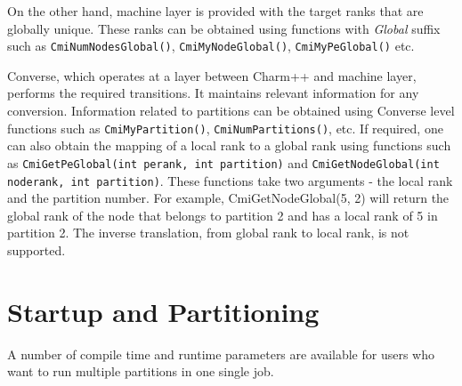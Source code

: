 On the other hand, machine layer is provided with the target ranks that
are globally unique. These ranks can be obtained using functions with \emph{Global}
suffix such as {\tt CmiNumNodesGlobal()}, {\tt CmiMyNodeGlobal()}, {\tt CmiMyPeGlobal()} etc.

Converse, which operates at a layer between Charm++ and machine layer,
performs the required transitions. It maintains relevant information for any
conversion. Information related to partitions can be obtained using Converse
level functions such as {\tt CmiMyPartition()}, {\tt CmiNumPartitions()}, 
etc. If required, one can also obtain the mapping of a local rank to a global
rank using functions such as {\tt CmiGetPeGlobal(int perank, int partition)} and 
{\tt CmiGetNodeGlobal(int noderank, int partition)}. These functions
take two arguments - the local rank and the partition number. For example, 
CmiGetNodeGlobal(5, 2) will return the global rank of the node that belongs to 
partition 2 and has a local rank of 5 in partition 2. The inverse 
translation, from global rank to local rank, is not supported.


\section{Startup and Partitioning}

A number of compile time and runtime parameters are available for users who want 
to run multiple partitions in one single job.

